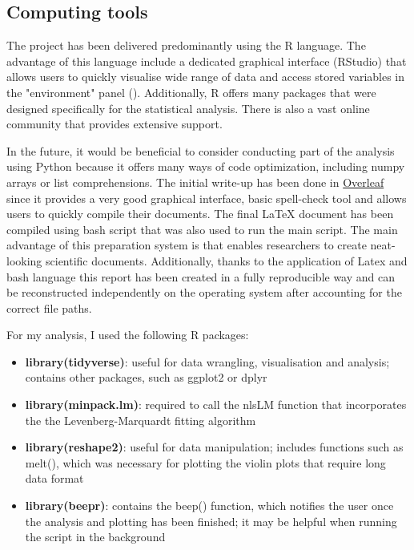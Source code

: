 \documentclass[a4paper,11pt]{article}
\begin{document}
\subsection{Computing tools}
    
The project has been delivered predominantly using the R language. The advantage of this language include a  dedicated graphical interface (RStudio) that allows users to quickly visualise wide range of data and access stored variables in the "environment" panel (\cite{RStudio}). Additionally, R offers many packages that were designed specifically for the statistical analysis. There is also a vast online community that provides extensive support.\par
In the future, it would be beneficial to consider conducting part of the analysis using Python because it offers many ways of code optimization, including numpy arrays or list comprehensions. 
The initial write-up has been done in \href{https://www.overleaf.com}{Overleaf} since it provides a very good graphical interface, basic spell-check tool and allows users to quickly compile their documents. The final LaTeX document has been compiled using bash script that was also used to run the main script. The main advantage of this preparation system is that enables researchers to create neat-looking scientific documents. Additionally, thanks to the application of Latex and bash language this report has been created in a fully reproducible way and can be reconstructed independently on the operating system after accounting for the correct file paths.\par
For my analysis, I used the following R packages:

\begin{itemize}
    \item \textbf{library(tidyverse)}: useful for data wrangling, visualisation and analysis; contains other packages, such as ggplot2 or dplyr
    \item \textbf{library(minpack.lm)}: required to call the nlsLM function that incorporates the the Levenberg-Marquardt fitting algorithm
    \item \textbf{library(reshape2)}: useful for data manipulation; includes functions such as melt(), which was necessary for plotting the violin plots that require long data format
    \item \textbf{library(beepr)}: contains the beep() function, which notifies the user once the analysis and plotting has been finished; it may be helpful when running the script in the background
\end{itemize}
\end{document}
